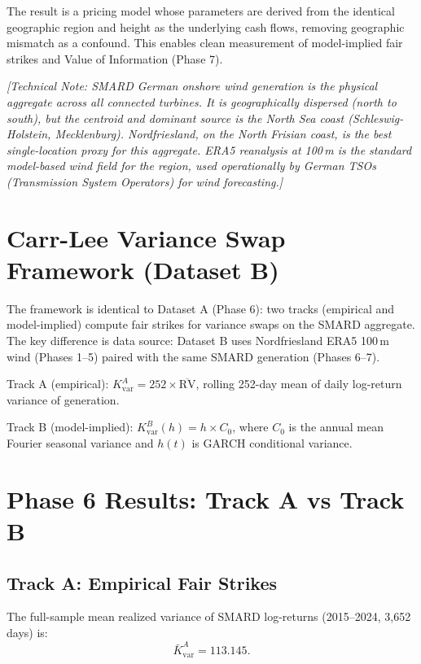 \documentclass[11pt, a4paper, twoside]{article}
\begin{document}
The result is a pricing model whose parameters are derived from the identical geographic region and height as the underlying cash flows, removing geographic mismatch as a confound. This enables clean measurement of model-implied fair strikes and Value of Information (Phase 7).

\textit{[Technical Note: SMARD German onshore wind generation is the physical aggregate across all connected turbines. It is geographically dispersed (north to south), but the centroid and dominant source is the North Sea coast (Schleswig-Holstein, Mecklenburg). Nordfriesland, on the North Frisian coast, is the best single-location proxy for this aggregate. ERA5 reanalysis at 100\,m is the standard model-based wind field for the region, used operationally by German TSOs (Transmission System Operators) for wind forecasting.]}

\section{Carr-Lee Variance Swap Framework (Dataset B)}

The framework is identical to Dataset A (Phase 6): two tracks (empirical and model-implied) compute fair strikes for variance swaps on the SMARD aggregate. The key difference is data source: Dataset B uses Nordfriesland ERA5 100\,m wind (Phases 1--5) paired with the same SMARD generation (Phases 6--7).

Track A (empirical): $K_{\text{var}}^A = 252 \times \overline{\text{RV}}$, rolling 252-day mean of daily log-return variance of generation.

Track B (model-implied): $K_{\text{var}}^B(h) = h \times C_0$, where $C_0$ is the annual mean Fourier seasonal variance and $h(t)$ is GARCH conditional variance.

\section{Phase 6 Results: Track A vs Track B}

\subsection{Track A: Empirical Fair Strikes}

The full-sample mean realized variance of SMARD log-returns (2015--2024, 3,652 days) is:
\begin{equation}
\bar{K}_{\text{var}}^A = 113.145.
\end{equation}
\end{document}

